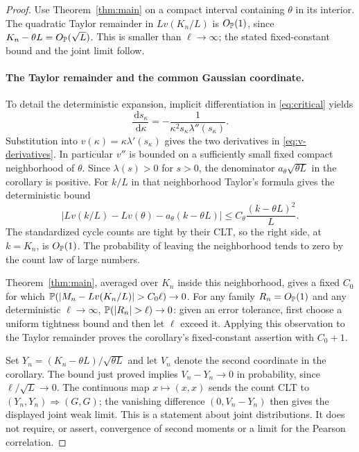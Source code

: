 \documentclass[11pt]{article}
\theoremstyle{definition}\newtheorem{definition}[theorem]{Definition}
\theoremstyle{remark}\newtheorem{remark}[theorem]{Remark}
\newcommand{\dd}{\,\mathrm d}\newcommand{\ind}{\mathbf1}
\numberwithin{equation}{section}\allowdisplaybreaks
\begin{document}
\begin{proof}
Use Theorem~\ref{thm:main} on a compact interval containing $\theta$ in
its interior. The quadratic Taylor remainder in
$L v(K_n/L)$ is $O_{\mathbb P}(1)$, since
$K_n-\theta L=O_{\mathbb P}(\sqrt L)$. This is smaller than $\ell\to\infty$;
the stated fixed-constant bound and the joint limit follow.

\paragraph{The Taylor remainder and the common Gaussian coordinate.}
To detail the deterministic expansion, implicit differentiation
in \eqref{eq:critical} yields
\[
 \frac{\dd s_\kappa}{\dd\kappa}
       =-\frac1{\kappa^2s_\kappa\lambda''(s_\kappa)}.
\]
Substitution into $v(\kappa)=\kappa\lambda'(s_\kappa)$
gives the two derivatives in \eqref{eq:v-derivatives}.
In particular $v''$ is bounded on a sufficiently small
fixed compact neighborhood of $\theta$. Since
$\lambda(s)>0$ for $s>0$, the denominator
$a_\theta\sqrt{\theta L}$ in the corollary is positive.
For $k/L$ in that neighborhood Taylor's formula gives
the deterministic bound
\[
 \left|L v(k/L)-L v(\theta)
              -a_\theta(k-\theta L)\right|
       \le C_\theta\frac{(k-\theta L)^2}{L}.
\]
The standardized cycle counts are tight by their CLT,
so the right side, at $k=K_n$, is $O_{\mathbb P}(1)$.
The probability of leaving the neighborhood tends
to zero by the count law of large numbers.

Theorem~\ref{thm:main}, averaged over $K_n$ inside
this neighborhood, gives a fixed $C_0$ for which
$\Pp(|M_n-Lv(K_n/L)|>C_0\ell)\to0$.
For any family $R_n=O_{\mathbb P}(1)$ and any deterministic
$\ell\to\infty$, $\Pp(|R_n|>\ell)\to0$: given an
error tolerance, first choose a uniform tightness
bound and then let $\ell$ exceed it. Applying this
observation to the Taylor remainder proves the
corollary's fixed-constant assertion with $C_0+1$.

Set $Y_n=(K_n-\theta L)/\sqrt{\theta L}$ and let
$V_n$ denote the second coordinate in the corollary.
The bound just proved implies
$V_n-Y_n\to0$ in probability, since
$\ell/\sqrt L\to0$. The continuous map
$x\mapsto(x,x)$ sends the count CLT to
$(Y_n,Y_n)\Rightarrow(G,G)$; the vanishing difference
$(0,V_n-Y_n)$ then gives the displayed joint weak limit.
This is a statement about joint distributions.
It does not require, or assert, convergence of second
moments or a limit for the Pearson correlation.

\end{proof}
\end{document}
